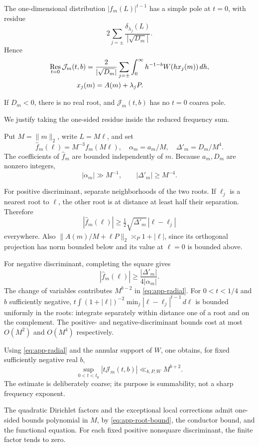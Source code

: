 \documentclass[11pt]{article}
\begin{document}
The one-dimensional distribution
$|f_m(L)|^{t-1}$ has a simple pole at
$t=0$, with residue
\[
2\sum_{j=\pm}
\frac{\delta_{\lambda_j}(L)}
{|\sqrt{D_m}|}.
\]
Hence
\begin{align}
\operatorname*{Res}_{t=0}\mathcal J_m(t,b)
={}&
\frac{2}{|\sqrt{D_m}|}
\sum_{j=\pm}
\int_0^\infty h^{-1-b}
W(hx_j(m))\,dh,\label{eq:app-coarea}\\
x_j(m)&=A(m)+\lambda_jP.\notag
\end{align}

If $D_m<0$, there is no real root,
and $\mathcal J_m(t,b)$ has no
$t=0$ coarea pole.

We justify taking the one-sided residue
inside the reduced frequency sum.

Put $M=\|m\|_2$, write $L=M\ell$, and set
\[
\widehat f_m(\ell)=
M^{-3}f_m(M\ell),\quad
\alpha_m=a_m/M,\quad
\Delta'_m=D_m/M^4.
\]
The coefficients of $\widehat f_m$
are bounded independently of $m$.
Because $a_m,D_m$ are nonzero integers,
\[
|\alpha_m|\gg M^{-1},
\qquad
|\Delta'_m|\ge M^{-4}.
\]

For positive discriminant, separate
neighborhoods of the two roots.
If $\ell_j$ is a nearest root to $\ell$, the other root is
at distance at least half their separation. Therefore
\[
|\widehat f_m(\ell)|
\ge \tfrac12\sqrt{\Delta'_m}\,|\ell-\ell_j|
\]
everywhere. Also $\|A(m)/M+\ell P\|_2\asymp_P 1+|\ell|$, since
its orthogonal projection has norm bounded below and its value at
$\ell=0$ is bounded above.

For negative discriminant, completing
the square gives
\[
|\widehat f_m(\ell)|
\ge\frac{|\Delta'_m|}{4|\alpha_m|}.
\]
The change of variables contributes $M^{b-2}$ in
\eqref{eq:app-radial}. For $0<t<1/4$ and $b$ sufficiently negative,
$t\int(1+|\ell|)^{-2}\min_j|\ell-\ell_j|^{t-1}\,d\ell$ is bounded
uniformly in the roots: integrate separately within distance one of
a root and on the complement. The positive- and negative-discriminant
bounds cost at most $O(M^2)$ and $O(M^4)$ respectively.

Using \eqref{eq:app-radial} and the
annular support of $W$, one obtains,
for fixed sufficiently negative real $b$,
\begin{equation}\label{eq:app-majorant}
\sup_{0<t<t_0}
\left|t\mathcal J_m(t,b)\right|
\ll_{b,P,W} M^{b+2}.
\end{equation}
The estimate is deliberately coarse;
its purpose is summability, not a sharp
frequency exponent.

The quadratic Dirichlet factors and
the exceptional local corrections admit
one-sided bounds polynomial in $M$,
by \eqref{eq:app-root-bound}, the conductor
bound, and the functional equation.
For each fixed positive nonsquare discriminant, the finite factor tends to zero.
\end{document}

